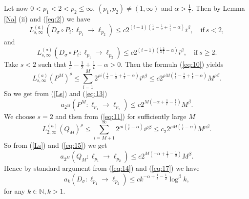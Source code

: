 \documentclass[12pt]{article}
\newcommand{\N}{{\mathbb N}}
\begin{document}
Let now  $0< p_1< 2< p_2\leq\infty$, $(p_1,p_2)\neq (1,\infty)$ and $ \alpha>\frac 1 t.$ %
Then by Lemma \ref{Na} (ii) and (\ref{eq:2}) we have
\begin{equation}
	L_{s,\infty}^{(a)}(D_\sigma\circ P_i: \ell_{p_1}\rightarrow \ell_{p_2})\leq 
	c2^{(i-1)(\frac{1}{s} -\frac{1}{2}+\frac{1}{t}-\alpha)}i^\beta,\quad\mathrm{if}\ s< 2,
	\label{eq:10}
\end{equation} 
and 
\begin{equation}
	L_{s,\infty}^{(a)}(D_\sigma\circ P_i: \ell_{p_1}\rightarrow \ell_{p_2})\leq c 2^{(i-1)(\frac{1}{s}\frac{2}{t}-\alpha)}i^\beta, \quad\mathrm{if}\ s\geq 2.
	\label{eq:11}
\end{equation}
Take $s<2$ such that $\frac{1}{s} -\frac{1}{2}+\frac{1}{t}-\alpha >0$. Then the formula (\ref{eq:10}) yields
\begin{equation}
	L_{s,\infty}^{(a)}(P^M)^\rho\leq \sum_{i=1}^{M} 2^{\rho i(\frac{1}{s} -\frac{1}{2}+\frac{1}{t}-\alpha)}i^{\rho\beta}\leq c 2^{\rho M(\frac{1}{s} - \frac{1}{2}+\frac{1}{t}-\alpha)}M^{\rho\beta}.
	\label{eq:13}
\end{equation}
So we get from (\ref{Ls}) and (\ref{eq:13})
\begin{equation}\label{eq:14}
	a_{2^M}(P^M:\ell_{p_1}\rightarrow \ell_{p_2})\leq c 2^{ M(-\alpha+ \frac{1}{t}-\frac{1}{2})}M^\beta .
\end{equation}
We choose  $s=2$  and then from (\ref{eq:11}) for sufficiently large $M$
\begin{equation}	\label{eq:15}
	L_{2,\infty}^{(a)}(Q_M)^\rho\leq \sum_{i=M+1}^{\infty} 2^{\rho i(\frac{1}{t} -\alpha)}i^{\rho\beta}\leq c_2 2^{\rho M(\frac{1}{t}-\alpha)}M^{\rho\beta}.
\end{equation}
So from (\ref{Ls}) and (\ref{eq:15}) we get
\begin{equation}
	a_{2^M}(Q_M:\ell_{p_1}\rightarrow \ell_{p_2})\leq c 2^{ M(-\alpha+\frac{1}{t}-\frac{1}{2})}M^\beta.
	\label{eq:17}
\end{equation}
Hence by standard argument from (\ref{eq:14}) and (\ref{eq:17}) we have
\begin{equation*}
	a_{k}(D_\sigma:\ell_{p_1}\rightarrow \ell_{p_2})\leq c k^{-\alpha+\frac{1}{t}-\frac{1}{2}}\log^\beta k,
\end{equation*}
for any $k\in\N, k>1$.
\end{document}
